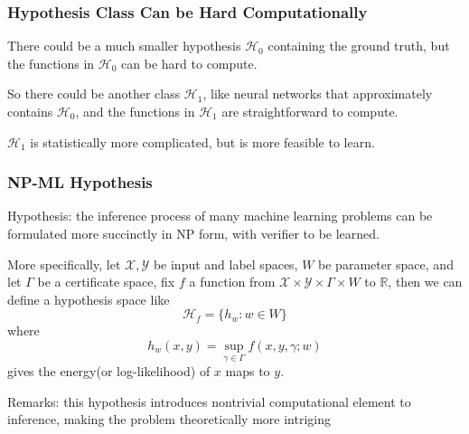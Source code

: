 \documentclass{beamer}   	%
\theoremstyle{definition}
\begin{document}
\begin{frame}
\frametitle{Hypothesis Class Can be Hard Computationally}

There could be a much smaller hypothesis $\mathcal{H}_0$ containing the ground truth, but the functions in $\mathcal{H}_0$ can be hard to compute.

So there could be another class $\mathcal{H}_1$, like neural networks that approximately contains $\mathcal{H}_0$, and the functions in $\mathcal{H}_1$ are straightforward to compute.

$\mathcal{H}_1$ is statistically more complicated, but is more feasible to learn.

\begin{center}
\end{center}
\end{frame}

\begin{frame}
\frametitle{NP-ML Hypothesis}
Hypothesis: the inference process of many machine learning problems can be formulated more succinctly in NP form, with verifier to be learned.

More specifically, let $\mathcal{X}, \mathcal{Y}$ be input and label spaces, $W$ be parameter space, and let $\Gamma$ be a certificate space, fix $f$ a function from $\mathcal{X}\times \mathcal{Y}\times \Gamma\times W$ to $\mathbb{R}$, then we can define a hypothesis space like
\begin{equation}
	\mathcal{H}_f=\{h_w: w\in W\}
\end{equation}
where
\begin{equation}
	h_w(x,y)=\sup_{\gamma\in \Gamma} f(x,y,\gamma;w)
\end{equation}
gives the energy(or log-likelihood) of $x$ maps to $y$.

\mbox{}

Remarks: this hypothesis introduces nontrivial computational element to inference, making the problem theoretically more intriging
\end{frame}
\end{document}
